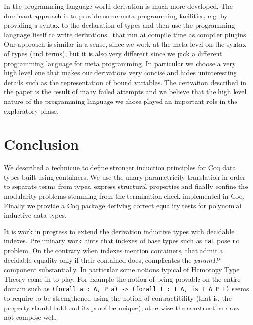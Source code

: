 \documentclass[a4paper,UKenglish,cleveref, autoref]{lipics-v2019}
\newcommand{\derive}[1]{\emph{#1}}
\begin{document}
In the programming language world derivation is much more developed.
The dominant approach is to provide some meta programming facilities,
e.g. by providing a syntax to the declaration of types and then use the
programming language itself to write 
derivations~\cite{Sheard:2002:TMH:636517.636528} that run at compile
time as compiler plugins. 
Our approach is similar in a sense, since we work at the meta level on
the syntax of types (and terms), but it is also very different since
we pick a different programming language for meta programming.  In
particular we choose a very high level one that makes our derivations
very concise and hides uninteresting details such as the
representation of bound variables.
The derivation described in the paper is the result of many failed
attempts and we believe that the high level nature of the programming
language we chose played an important role in the exploratory phase.

\section{Conclusion} %
\label{sec:conclusion}

We described a technique to define stronger induction principles
for Coq data types built using containers. We use the unary
parametricity translation in order to separate terms from types,
express structural properties and finally confine the modularity
problems stemming from the termination check implemented in Coq.
Finally we provide a Coq package deriving correct equality tests
for polynomial inductive data types.

It is work in progress to extend the derivation 
inductive types with decidable indexes. Preliminary work hints that
indexes of base types such as \lstinline+nat+ pose no problem.
On the contrary when indexes mention containers, that admit a decidable
equality only if their contained does,
complicates the \derive{param1P} component
substantially. In particular some notions typical of Homotopy Type Theory
come in to play. For example the notion of being provable on the entire domain
such as \lstinline+(forall a : A, P a) -> (forall t : T A, is_T A P t)+ seems
to require to be strengthened using the notion of contractibility (that
is, the property should hold and its proof be unique), otherwise the
construction does not compose well.

\end{document}
